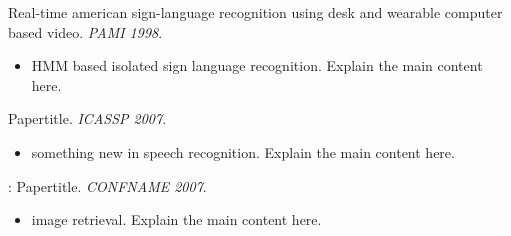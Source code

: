 \documentclass[11pt,a4paper,landscape]{article}
\begin{document}
\NewPage{} 
\vfill 
\begin{description}
\item [T.~Starner, J.~Weaver, A.~Pentland:] Real-time american sign-language
  recognition using desk and wearable computer based video. {\em PAMI 1998}.
  \begin{itemize}
  \item HMM based isolated sign language recognition. Explain the main content here.
  \end{itemize}
\item [Povey:] Papertitle. {\em ICASSP 2007}.
  \begin{itemize}
  \item something new in speech recognition. Explain the main content here.
  \end{itemize}
\item \cite{loupias:_wavel_salien_point_image_retriev}: Papertitle. {\em CONFNAME 2007}.
  \begin{itemize}
  \item image retrieval. Explain the main content here.
  \end{itemize}
\end{description}
\vfill
\end{document}
